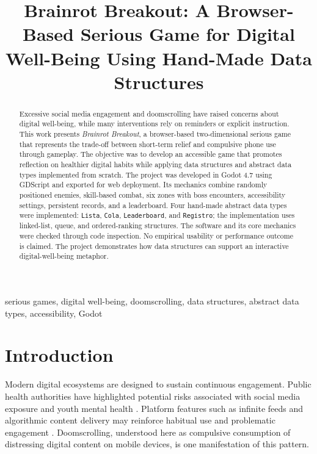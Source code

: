 \documentclass[conference]{IEEEtran}
\title{Brainrot Breakout: A Browser-Based Serious Game for Digital Well-Being Using Hand-Made Data Structures}
\author{
\IEEEauthorblockN{Samuel Navarro, Jos\'e Daza, Manuel Hormechea, Iv\'an Rivas}
\IEEEauthorblockA{\'Ultimo Scroll Studios, Universidad del Norte\\
Barranquilla, Colombia}
}
\begin{document}
\maketitle

\begin{abstract}
Excessive social media engagement and doomscrolling have raised concerns about digital well-being, while many interventions rely on reminders or explicit instruction. This work presents \emph{Brainrot Breakout}, a browser-based two-dimensional serious game that represents the trade-off between short-term relief and compulsive phone use through gameplay. The objective was to develop an accessible game that promotes reflection on healthier digital habits while applying data structures and abstract data types implemented from scratch. The project was developed in Godot 4.7 using GDScript and exported for web deployment. Its mechanics combine randomly positioned enemies, skill-based combat, six zones with boss encounters, accessibility settings, persistent records, and a leaderboard. Four hand-made abstract data types were implemented: \texttt{Lista}, \texttt{Cola}, \texttt{Leaderboard}, and \texttt{Registro}; the implementation uses linked-list, queue, and ordered-ranking structures. The software and its core mechanics were checked through code inspection. No empirical usability or performance outcome is claimed. The project demonstrates how data structures can support an interactive digital-well-being metaphor.
\end{abstract}

\begin{IEEEkeywords}
serious games, digital well-being, doomscrolling, data structures, abstract data types, accessibility, Godot
\end{IEEEkeywords}


\section{Introduction}
\label{p1-sec:intro}

Modern digital ecosystems are designed to sustain continuous engagement. Public health authorities have highlighted potential risks associated with social media exposure and youth mental health \cite{surgeon2023}. Platform features such as infinite feeds and algorithmic content delivery may reinforce habitual use and problematic engagement \cite{sharpe2026}. Doomscrolling, understood here as compulsive consumption of distressing digital content on mobile devices, is one manifestation of this pattern.
\end{document}
